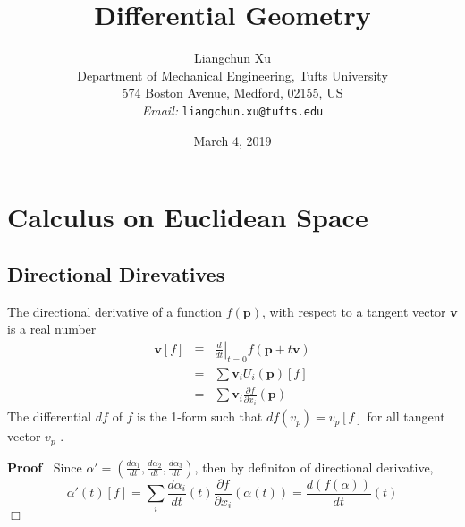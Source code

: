 \documentclass{article}
\newcommand{\tmaffiliation}[1]{\\ #1}
\newcommand{\tmemail}[1]{\\ \textit{Email:} \texttt{#1}}
\newcommand{\tmstrong}[1]{\textbf{#1}}
\newenvironment{proof}{\noindent\textbf{Proof\ }}{\hspace*{\fill}$\Box$\medskip}
\begin{document}
\title{Differential Geometry}

\author{
  Liangchun Xu
  \tmaffiliation{Department of Mechanical Engineering, Tufts University\\
  574 Boston Avenue, Medford, 02155, US}
  \tmemail{liangchun.xu@tufts.edu}
}

\date{March 4, 2019}

\maketitle

{\tableofcontents}

\section{Calculus on Euclidean Space}

\subsection{Directional Direvatives}

The directional derivative of a function $f (\mathbf{p})$, with respect to a
tangent vector {\tmstrong{$\mathbf{v}$}} is a real number
\begin{eqnarray}
  \mathbf{v} [f] & \equiv & \left. \frac{d}{d t} \right|_{t = 0} f
  (\mathbf{p}+ t\mathbf{v}) \nonumber\\
  & = & \sum \mathbf{v}_i U_i (\mathbf{p}) [f] \nonumber\\
  & = & \sum \mathbf{v}_i \frac{\partial f}{\partial x_i} (\mathbf{p}) 
\end{eqnarray}
The differential $d f$ of $f$ is the 1-form such that $d f (v_p) = v_p [f]$
for all tangent vector $v_p$ {\cite{o2006elementary}}.

{}

\begin{proof}
  Since $\alpha' = \left( \frac{d \alpha_1}{d t}, \frac{d \alpha_2}{d t},
  \frac{d \alpha_3}{d t} \right)$, then by definiton of directional
  derivative,
  \[ \alpha' (t) [f] = \sum_i \frac{d \alpha_i}{d t} (t) \frac{\partial
     f}{\partial x_i} (\alpha (t)) = \frac{d (f (\alpha))}{d t} (t) \]
\end{proof}
\end{document}
